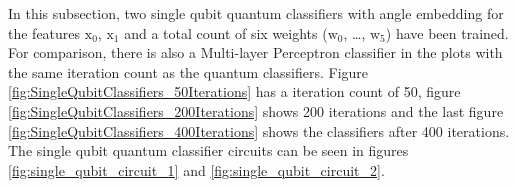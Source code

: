 In this subsection, two single qubit quantum classifiers with angle embedding for the features $\mathrm{x_0}$, $\mathrm{x_1}$ and a total count of six weights ($\mathrm{w_0}$, …, $\mathrm{w_5}$) have been trained. For comparison, there is also a Multi-layer Perceptron classifier in the plots with the same iteration count as the quantum classifiers. Figure \ref{fig:SingleQubitClassifiers_50Iterations} has a iteration count of 50, figure \ref{fig:SingleQubitClassifiers_200Iterations} shows 200 iterations and the last figure \ref{fig:SingleQubitClassifiers_400Iterations} shows the classifiers after 400 iterations. The single qubit quantum classifier circuits can be seen in figures \ref{fig:single_qubit_circuit_1} and \ref{fig:single_qubit_circuit_2}.\\
\\

